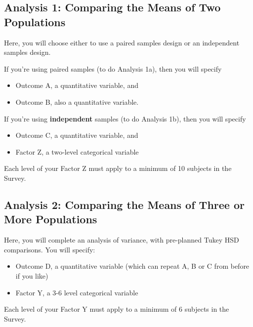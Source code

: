 \documentclass[]{book}
\providecommand{\tightlist}{%
  \setlength{\itemsep}{0pt}\setlength{\parskip}{0pt}}
\theoremstyle{definition}
\theoremstyle{definition}
\theoremstyle{definition}
\theoremstyle{remark}
\begin{document}
\hypertarget{analysis-1-comparing-the-means-of-two-populations}{%
\subsection{Analysis 1: Comparing the Means of Two
Populations}\label{analysis-1-comparing-the-means-of-two-populations}}

Here, you will choose either to use a paired samples design or an
independent samples design.

If you're using paired samples (to do Analysis 1a), then you will
specify

\begin{itemize}
\tightlist
\item
  Outcome A, a quantitative variable, and
\item
  Outcome B, also a quantitative variable.
\end{itemize}

If you're using \textbf{independent} samples (to do Analysis 1b), then
you will specify

\begin{itemize}
\tightlist
\item
  Outcome C, a quantitative variable, and
\item
  Factor Z, a two-level categorical variable
\end{itemize}

Each level of your Factor Z must apply to a minimum of 10 subjects in
the Survey.

\hypertarget{analysis-2-comparing-the-means-of-three-or-more-populations}{%
\subsection{Analysis 2: Comparing the Means of Three or More
Populations}\label{analysis-2-comparing-the-means-of-three-or-more-populations}}

Here, you will complete an analysis of variance, with pre-planned Tukey
HSD comparisons. You will specify:

\begin{itemize}
\tightlist
\item
  Outcome D, a quantitative variable (which can repeat A, B or C from
  before if you like)
\item
  Factor Y, a 3-6 level categorical variable
\end{itemize}

Each level of your Factor Y must apply to a minimum of 6 subjects in the
Survey.
\end{document}
